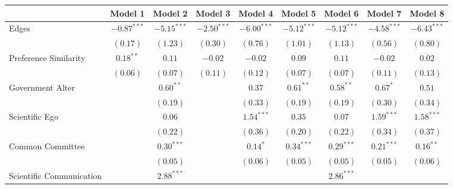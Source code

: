 \documentclass[fleqn,12pt]{wlscirep}
\begin{document}
\clearpage
\begin{landscape}
\begin{table}
\begin{center}
\begin{tabular}{l c c c c c c c c }
\hline
 & Model 1 & Model 2 & Model 3 & Model 4 & Model 5 & Model 6 & Model 7 & Model 8 \\
\hline
Edges                   & $-0.87^{***}$ & $-5.15^{***}$ & $-2.50^{***}$ & $-6.00^{***}$ & $-5.12^{***}$ & $-5.12^{***}$ & $-4.58^{***}$ & $-6.43^{***}$ \\
                        & $(0.17)$      & $(1.23)$      & $(0.30)$      & $(0.76)$      & $(1.01)$      & $(1.13)$      & $(0.56)$      & $(0.80)$      \\
        
Preference Similarity      &    $0.18^{**}$            & $0.11$        &     $-0.02$           & $-0.02$       & $0.09$        & $0.11$        & $-0.02$       & $0.02$        \\
                        &     $(0.06)$           & $(0.07)$      &     $(0.11)$           & $(0.12)$      & $(0.07)$      & $(0.07)$      & $(0.11)$      & $(0.13)$      \\
Government Alter &               & $0.60^{**}$   &               & $0.37$        & $0.61^{**}$   & $0.58^{**}$   & $0.67^{*}$    & $0.51$        \\
                        &               & $(0.19)$      &               & $(0.33)$      & $(0.19)$      & $(0.19)$      & $(0.30)$      & $(0.34)$      \\
Scientific Ego &               & $0.06$        &               & $1.54^{***}$  & $0.35$        & $0.07$        & $1.59^{***}$  & $1.58^{***}$  \\
                        &               & $(0.22)$      &               & $(0.36)$      & $(0.20)$      & $(0.22)$      & $(0.34)$      & $(0.37)$      \\
Common Committee      &               & $0.30^{***}$  &               & $0.14^{*}$    & $0.34^{***}$  & $0.29^{***}$  & $0.21^{***}$  & $0.16^{**}$   \\
                        &               & $(0.05)$      &               & $(0.06)$      & $(0.05)$      & $(0.05)$      & $(0.05)$      & $(0.06)$      \\
Scientific Communication          &               & $2.88^{***}$  &               &               &               & $2.86^{***}$  &               &               \\

\end{tabular}
\end{center}
\end{table}
\end{landscape}
\end{document}
